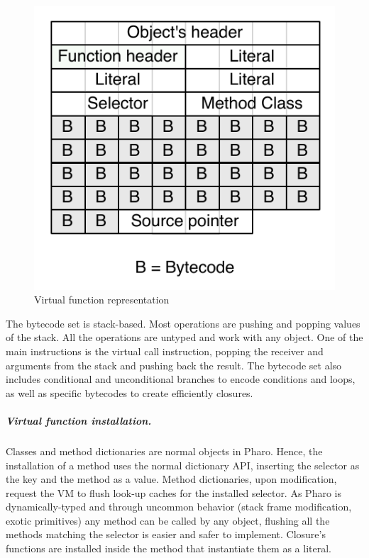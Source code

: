\documentclass[a4paper,12pt,twoside]{../includes/ThesisStyle}
\begin{document}
\begin{figure}[h!]
    \begin{center}
        \includegraphics[width=0.38\linewidth]{CompiledCode}
        \caption{Virtual function representation}
        \label{fig:CompiledCode}
    \end{center}
\end{figure}

The bytecode set is stack-based. Most operations are pushing and popping values of the stack. All the operations are untyped and work with any object. One of the main instructions is the virtual call instruction, popping the receiver and arguments from the stack and pushing back the result. The bytecode set also includes conditional and unconditional branches to encode conditions and loops, as well as specific bytecodes to create efficiently closures.









\subparagraph{Virtual function installation.}

Classes and method dictionaries are normal objects in Pharo. Hence, the installation of a method uses the normal dictionary API, inserting the selector as the key and the method as a value. Method dictionaries, upon modification, request the VM to flush look-up caches for the installed selector. As Pharo is dynamically-typed and through uncommon behavior (stack frame modification, exotic primitives) any method can be called by any object, flushing all the methods matching the selector is easier and safer to implement. Closure's functions are installed inside the method that instantiate them as a literal. %
\end{document}

